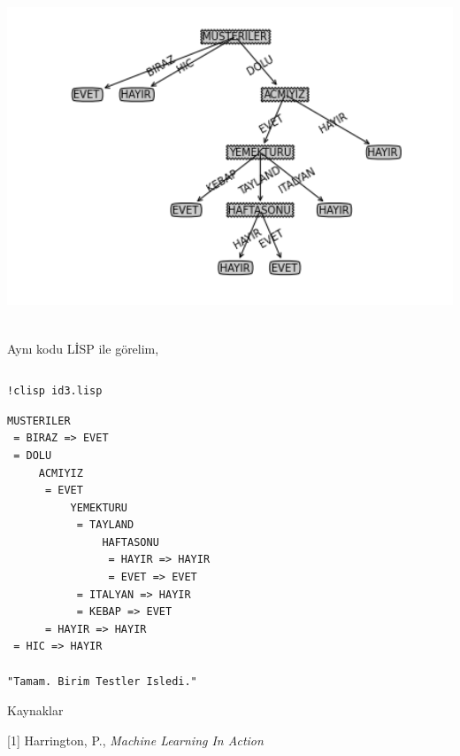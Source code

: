 \documentclass[12pt,fleqn]{article}\usepackage{../../common}
\begin{document}
\includegraphics[height=10cm]{id3_1.png}

Aynı kodu LİSP ile görelim,

\inputminted[fontsize=\footnotesize]{python}{id3.lisp}

\begin{verbatim}
!clisp id3.lisp
\end{verbatim}

\begin{verbatim}
MUSTERILER
 = BIRAZ => EVET
 = DOLU
     ACMIYIZ
      = EVET
          YEMEKTURU
           = TAYLAND
               HAFTASONU
                = HAYIR => HAYIR
                = EVET => EVET
           = ITALYAN => HAYIR
           = KEBAP => EVET
      = HAYIR => HAYIR
 = HIC => HAYIR

"Tamam. Birim Testler Isledi." 
\end{verbatim}

Kaynaklar 

[1] Harrington, P., {\em Machine Learning In Action}
\end{document}
